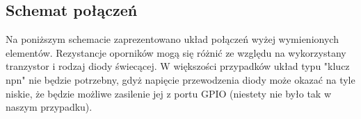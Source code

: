 \subsection{Schemat połączeń}

Na poniższym schemacie zaprezentowano układ połączeń wyżej wymienionych elementów. Rezystancje oporników mogą się różnić ze względu na wykorzystany tranzystor i rodzaj diody świecącej. W większości przypadków układ typu "klucz npn" nie będzie potrzebny, gdyż napięcie przewodzenia diody może okazać na tyle niskie, że będzie możliwe zasilenie jej z portu GPIO (niestety nie było tak w naszym przypadku).

\begin{center}
\end{center}



